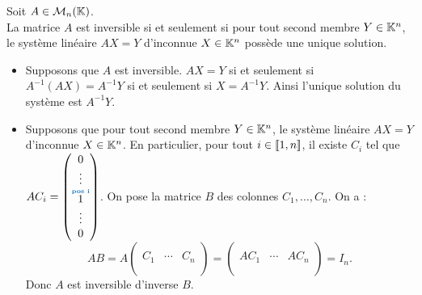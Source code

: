 \documentclass{book}
\begin{document}
\begin{Proposition}
Soit $A\in\mathcal{M}_{n}(\mathbb{K})$.\\
La matrice $A$ est inversible si et seulement si pour tout second membre $Y \in \mathbb{K}^n$, le système linéaire $AX =Y$ d'inconnue $X \in \mathbb{K}^n$
possède une unique solution.
\end{Proposition}
\begin{Demonstration}
\begin{itemize}
\item Supposons que $A$ est inversible. $AX =Y $ si et seulement si $A^{-1}(AX)=A^{-1}Y$ si et seulement si $X=A^{-1}Y$. Ainsi l'unique solution du système est $A^{-1}Y.$
\item Supposons que pour tout second membre $Y \in \mathbb{K}^n$, le système linéaire $AX =Y$ d'inconnue $X \in \mathbb{K}^n$. En particulier, pour tout $i\in\mathopen\lbrack\!\lbrack1,n \mathclose\rbrack\!\rbrack$, il existe $C_i$ tel que $A C_i=\begin{pmatrix}0\\\vdots\\\overset{\text{{\tiny \propri{pos i}}}}{1}\\\vdots\\0\end{pmatrix}$. On pose la matrice $B$ des colonnes $C_1,\dots,C_n$. On a :
 $$AB=A\begin{pmatrix}
&   & \\
C_1 & \cdots & C_{n}\\
&  & \\
\end{pmatrix}=\begin{pmatrix}
&   & \\
AC_1 & \cdots & AC_{n}\\
&   & \\
\end{pmatrix}=I_n.$$ Donc $A$ est inversible d'inverse $B$.
\end{itemize}
\end{Demonstration}
\end{document}

